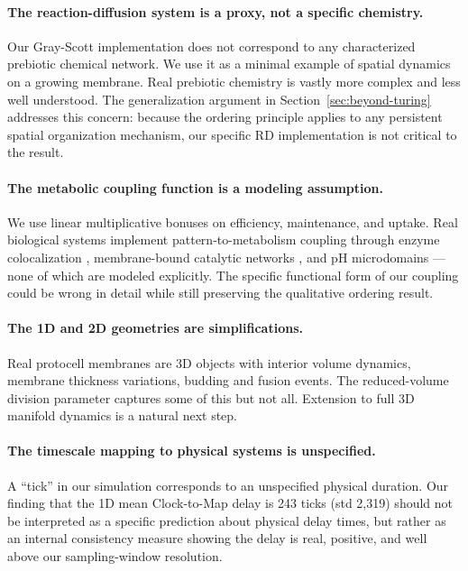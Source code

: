 \documentclass[11pt,letterpaper]{article}
\begin{document}
\paragraph{The reaction-diffusion system is a proxy, not a specific chemistry.} Our Gray-Scott implementation does not correspond to any characterized prebiotic chemical network. We use it as a minimal example of spatial dynamics on a growing membrane. Real prebiotic chemistry is vastly more complex and less well understood. The generalization argument in Section~\ref{sec:beyond-turing} addresses this concern: because the ordering principle applies to any persistent spatial organization mechanism, our specific RD implementation is not critical to the result.

\paragraph{The metabolic coupling function is a modeling assumption.} We use linear multiplicative bonuses on efficiency, maintenance, and uptake. Real biological systems implement pattern-to-metabolism coupling through enzyme colocalization \citep{agapakis2012natural}, membrane-bound catalytic networks \citep{lane2015vital,martin2007origin}, and pH microdomains --- none of which are modeled explicitly. The specific functional form of our coupling could be wrong in detail while still preserving the qualitative ordering result.

\paragraph{The 1D and 2D geometries are simplifications.} Real protocell membranes are 3D objects with interior volume dynamics, membrane thickness variations, budding and fusion events. The reduced-volume division parameter captures some of this but not all. Extension to full 3D manifold dynamics is a natural next step.

\paragraph{The timescale mapping to physical systems is unspecified.} A ``tick'' in our simulation corresponds to an unspecified physical duration. Our finding that the 1D mean Clock-to-Map delay is 243 ticks (std 2{,}319) should not be interpreted as a specific prediction about physical delay times, but rather as an internal consistency measure showing the delay is real, positive, and well above our sampling-window resolution.
\end{document}
